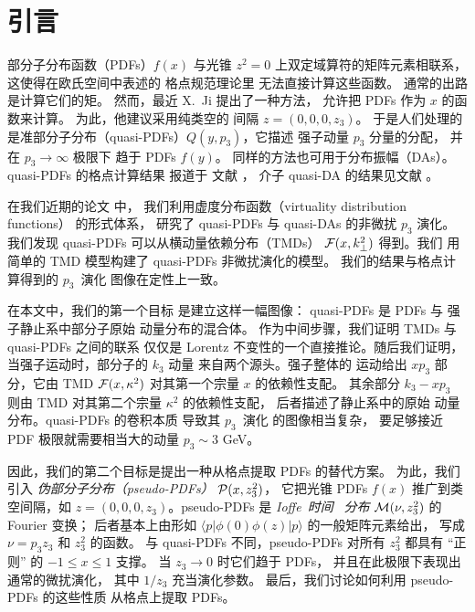 \section{引言}

部分子分布函数（PDFs）$f(x)$ \cite{Feynman:1973xc}
与光锥 $z^2=0$ 上双定域算符的矩阵元素相联系，
这使得在欧氏空间中表述的
格点规范理论里
无法直接计算这些函数。
通常的出路是计算它们的矩。
然而，最近 X.~Ji \cite{Ji:2013dva} 提出了一种方法，
允许把 PDFs 作为 $x$ 的函数来计算。
为此，他建议采用纯类空的
间隔 $z=(0,0,0,z_3)$。
于是人们处理的是准部分子分布（quasi-PDFs）$Q(y,p_3)$，它描述
强子动量 $p_3$ 分量的分配，
并在 \mbox{$p_3 \to \infty$} 极限下
趋于 PDFs $f(y)$。
同样的方法也可用于分布振幅（DAs）。
quasi-PDFs 的格点计算结果
报道于
文献 \cite{Lin:2014zya,Chen:2016utp,Alexandrou:2015rja}，
介子 quasi-DA 的结果见文献 \cite{Zhang:2017bzy}。

在我们近期的论文 \cite{Radyushkin:2016hsy,Radyushkin:2017gjd} 中，
我们利用虚度分布函数（virtuality distribution functions）
\cite{Radyushkin:2014vla,Radyushkin:2015gpa} 的形式体系，
研究了 quasi-PDFs 与 quasi-DAs 的非微扰 $p_3$ 演化。
我们发现 quasi-PDFs 可以从横动量依赖分布（TMDs）
${\cal F} (x, k_\perp^2)$ 得到。我们
用简单的 TMD 模型构建了
quasi-PDFs 非微扰演化的模型。
我们的结果与格点计算得到的
\mbox{$p_3$ 演化} 图像在定性上一致。

在本文中，我们的第一个目标
是建立这样一幅图像：
quasi-PDFs 是 PDFs 与
强子静止系中部分子原始
动量分布的混合体。
作为中间步骤，我们证明 TMDs 与 quasi-PDFs 之间的联系
\cite{Radyushkin:2016hsy}
仅仅是 Lorentz 不变性的一个直接推论。随后我们证明，
当强子运动时，部分子的 $k_3$ 动量
来自两个源头。强子整体的
运动给出
$xp_3$ 部分，它由 TMD ${\cal F} (x, \kappa^2)$ 对其第一个宗量 $x$
的依赖性支配。
其余部分 $k_3-xp_3$
则由 TMD 对其第二个宗量 $\kappa^2$ 的依赖性支配，
后者描述了静止系中的原始
动量分布。quasi-PDFs 的卷积本质
导致其 \mbox{$p_3$ 演化} 的图像相当复杂，
要足够接近 PDF 极限就需要相当大的动量 $p_3 \sim 3$ GeV。

因此，我们的第二个目标是提出一种从格点提取 PDFs 的替代方案。
为此，我们引入
{\it 伪部分子分布（pseudo-PDFs）} ${\cal P} (x, z_3^2) $，
它把光锥 PDFs $f(x)$ 推广到类空间隔，如
$z=(0,0,0,z_3)$。pseudo-PDFs 是
\mbox{{\it Ioffe 时间} \cite{Ioffe:1969kf}} {\it 分布} \cite{Braun:1994jq}
${\cal M} (\nu, z_3^2)$ 的 Fourier 变换；
后者基本上由形如 $
\langle p | \phi(0) \phi (z)|p \rangle $
的一般矩阵元素给出，
写成 $\nu = p_3 z_3$ 和 $z_3^2$ 的函数。
与 quasi-PDFs 不同，pseudo-PDFs 对所有 $z_3^2$
都具有 ``正则'' 的 $-1 \leq x \leq 1$ 支撑。
当 $z_3\to 0$ 时它们趋于 PDFs，
并且在此极限下表现出通常的微扰演化，
其中 $1/z_3$ 充当演化参数。
最后，我们讨论如何利用 pseudo-PDFs 的这些性质
从格点上提取 PDFs。
